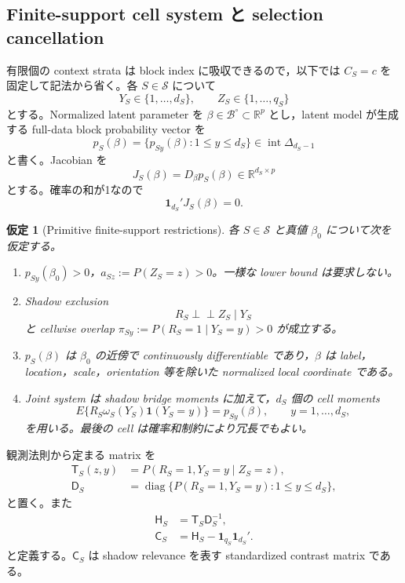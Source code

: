\documentclass[11pt,a4paper]{ltjsarticle}
\newtheorem{assumption}{仮定}[section]
\theoremstyle{remark}
\newcommand{\R}{\mathbb R}
\newcommand{\ind}{\perp\!\!\!\perp}
\newcommand{\one}{\bm 1}
\newcommand{\cS}{\mathcal S}
\newcommand{\diag}{\operatorname{diag}}
\begin{document}
\subsection{Finite-support cell system と selection cancellation}
有限個の context strata は block index に吸収できるので，以下では $C_S=c$ を固定して記法から省く。各 $S\in\cS$ について
\[
Y_S\in\{1,\ldots,d_S\},
\qquad
Z_S\in\{1,\ldots,q_S\}
\]
とする。Normalized latent parameter を $\beta\in\mathcal B^\circ\subset\R^p$ とし，latent model が生成する full-data block probability vector を
\[
p_S(\beta)=\{p_{Sy}(\beta):1\le y\le d_S\}\in\operatorname{int}\Delta_{d_S-1}
\]
と書く。Jacobian を
\[
J_S(\beta)=D_\beta p_S(\beta)\in\R^{d_S\times p}
\]
とする。確率の和が1なので
\begin{equation}
\one_{d_S}'J_S(\beta)=0.
\label{eq:probjacsumzero}
\end{equation}

\begin{assumption}[Primitive finite-support restrictions]\label{as:primitivefinite}
各 $S\in\cS$ と真値 $\beta_0$ について次を仮定する。
\begin{enumerate}[label=(PF\arabic*)]
\item $p_{Sy}(\beta_0)>0$，$a_{Sz}:=P(Z_S=z)>0$。一様な lower bound は要求しない。
\item Shadow exclusion
\[
R_S\ind Z_S\mid Y_S
\]
と cellwise overlap $\pi_{Sy}:=P(R_S=1\mid Y_S=y)>0$ が成立する。
\item $p_S(\beta)$ は $\beta_0$ の近傍で continuously differentiable であり，$\beta$ は label，location，scale，orientation 等を除いた normalized local coordinate である。
\item Joint system は shadow bridge moments に加えて，$d_S$ 個の cell moments
\[
E\{R_S\omega_S(Y_S)\one(Y_S=y)\}=p_{Sy}(\beta),
\qquad y=1,\ldots,d_S,
\]
を用いる。最後の cell は確率和制約により冗長でもよい。
\end{enumerate}
\end{assumption}

観測法則から定まる matrix を
\begin{align}
\mathsf T_S(z,y)
&=P(R_S=1,Y_S=y\mid Z_S=z),
\label{eq:primitiveT}\\
\mathsf D_S
&=\diag\{P(R_S=1,Y_S=y):1\le y\le d_S\},
\label{eq:primitiveD}
\end{align}
と置く。また
\begin{align}
\mathsf H_S
&=\mathsf T_S\mathsf D_S^{-1},
\label{eq:primitiveH}\\
\mathsf C_S
&=\mathsf H_S-\one_{q_S}\one_{d_S}'.
\label{eq:primitiveC}
\end{align}
と定義する。$\mathsf C_S$ は shadow relevance を表す standardized contrast matrix である。
\end{document}
